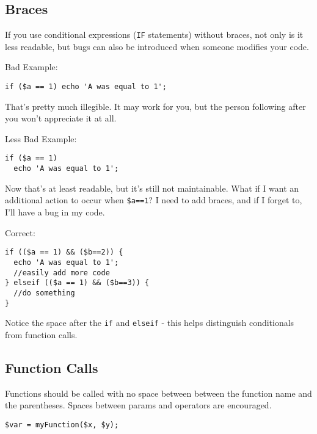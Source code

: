     \subsection{Braces}
        If you use conditional expressions (\texttt{IF} statements) without braces, not only is it less readable,
        but bugs can also be introduced when someone modifies your code.
        \begin{description}
        \item{Bad Example:}
\begin{lstlisting}[stepnumber=0,frame={}]
if ($a == 1) echo 'A was equal to 1';
\end{lstlisting}

        That's pretty much illegible. It may work for you, but the person following after you won't appreciate it at all.

        \item{Less Bad Example:}
\begin{lstlisting}[stepnumber=0,frame={}]
if ($a == 1)
  echo 'A was equal to 1';
\end{lstlisting}

        Now that's at least readable, but it's still not maintainable. What if I want an additional action to occur when
        \texttt{\$a==1}? I need to add braces, and if I forget to, I'll have a bug in my code.

        \item{Correct:}
\begin{lstlisting}[stepnumber=0,frame={}]
if (($a == 1) && ($b==2)) {
  echo 'A was equal to 1';
  //easily add more code
} elseif (($a == 1) && ($b==3)) {
  //do something
}
\end{lstlisting}

            Notice the space after the \texttt{if} and \texttt{elseif} - this helps distinguish conditionals from function calls.
        \end{description}

    \subsection{Function Calls}
        Functions should be called with no space between between the function name and the parentheses.
        Spaces between params and operators are encouraged.

\begin{lstlisting}[stepnumber=0,frame={}]
$var = myFunction($x, $y);
\end{lstlisting}

